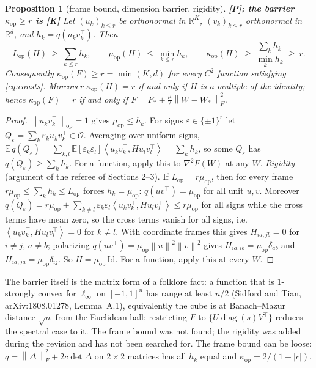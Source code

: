 \documentclass[11pt]{article}
\newtheorem{proposition}[theorem]{Proposition}
\theoremstyle{definition}
\theoremstyle{remark}
\newcommand{\R}{\mathbb{R}}
\newcommand{\E}{\mathbb{E}}
\newcommand{\norm}[1]{\left\|#1\right\|}
\newcommand{\nop}[1]{\left\|#1\right\|_{\mathrm{op}}}
\newcommand{\nF}[1]{\left\|#1\right\|_{F}}
\newcommand{\inner}[2]{\left\langle #1, #2 \right\rangle}
\newcommand{\abs}[1]{\left|#1\right|}
\newcommand{\diag}{\operatorname{diag}}
\newcommand{\Lop}{L_{\mathrm{op}}}
\newcommand{\muop}{\mu_{\mathrm{op}}}
\newcommand{\kop}{\kappa_{\mathrm{op}}}
\newcommand{\cO}{\mathcal{O}}
\begin{document}
\begin{proposition}[frame bound, dimension barrier, rigidity]\label{prop:frame} \textbf{[P]; the barrier $\kop\ge r$ is [K]}
Let $(u_k)_{k\le r}$ be orthonormal in $\R^K$, $(v_k)_{k\le r}$ orthonormal in $\R^d$, and $h_k=q(u_kv_k^\top)$. Then
\[
\Lop(H)\ \ge\ \sum_{k\le r}h_k,\qquad \muop(H)\ \le\ \min_{k\le r}h_k,\qquad
\kop(H)\ \ge\ \frac{\sum_kh_k}{\min_kh_k}\ \ge\ r .
\]
Consequently $\kop(F)\ge r=\min(K,d)$ for every $C^2$ function satisfying \eqref{eq:consts}. Moreover $\kop(H)=r$ if
and only if $H$ is a multiple of the identity; hence $\kop(F)=r$ if and only if
$F=F_\ast+\frac\mu2\nF{W-W_\ast}^2$.
\end{proposition}
\begin{proof}
$\nop{u_kv_k^\top}=1$ gives $\muop\le h_k$. For signs $\varepsilon\in\{\pm1\}^r$ let
$Q_\varepsilon=\sum_k\varepsilon_ku_kv_k^\top\in\cO$. Averaging over uniform signs,
$\E\,q(Q_\varepsilon)=\sum_{k,l}\E[\varepsilon_k\varepsilon_l]\inner{u_kv_k^\top}{Hu_lv_l^\top}=\sum_kh_k$, so some $Q_\varepsilon$ has
$q(Q_\varepsilon)\ge\sum_kh_k$. For a function, apply this to $\nabla^2F(W)$ at any $W$.
\emph{Rigidity} (argument of the referee of Sections 2--3). If $\Lop=r\muop$, then for every frame
$r\muop\le\sum_kh_k\le\Lop$ forces $h_k=\muop$: $q(uv^\top)=\muop$ for all unit $u,v$. Moreover
$q(Q_\varepsilon)=r\muop+\sum_{k\ne l}\varepsilon_k\varepsilon_l\inner{u_kv_k^\top}{Hu_lv_l^\top}\le r\muop$ for all signs while the
cross terms have mean zero, so the cross terms vanish for all signs, i.e.\ $\inner{u_kv_k^\top}{Hu_lv_l^\top}=0$ for
$k\ne l$. With coordinate frames this gives $H_{ia,jb}=0$ for $i\ne j$, $a\ne b$; polarizing $q(uv^\top)=\muop\norm
u^2\norm v^2$ gives $H_{ia,ib}=\muop\delta_{ab}$ and $H_{ia,ja}=\muop\delta_{ij}$. So $H=\muop\,\mathrm{Id}$. For a
function, apply this at every $W$.
\end{proof}

The barrier itself is the matrix form of a folklore fact: a function that is $1$-strongly convex for $\ell_\infty$ on
$[-1,1]^n$ has range at least $n/2$ (Sidford and Tian, arXiv:1808.01278, Lemma~A.1), equivalently the cube is at
Banach--Mazur distance $\sqrt n$ from the Euclidean ball; restricting $F$ to $\{U\diag(s)V^\top\}$ reduces the spectral
case to it. The frame bound was not found; the rigidity was added during the revision and has not been searched for.
The frame bound can be loose: $q=\nF\Delta^2+2c\det\Delta$
on $2\times2$ matrices has all $h_k$ equal and $\kop=2/(1-\abs c)$.
\end{document}
